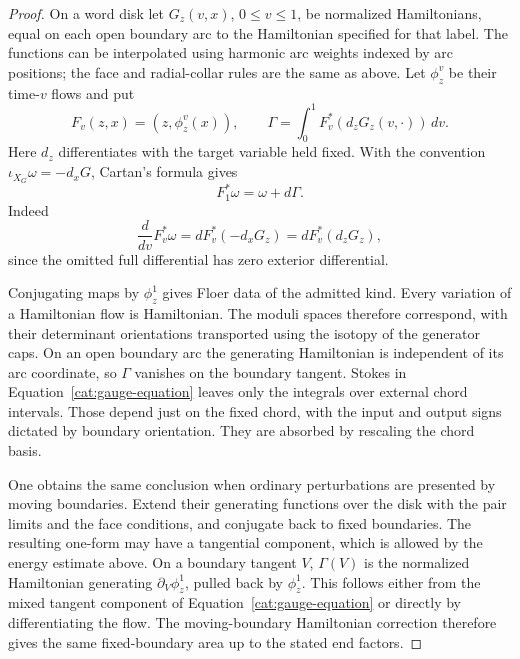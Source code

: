 \documentclass[11pt]{article}
\theoremstyle{definition}
\theoremstyle{remark}
\numberwithin{equation}{section}
\begin{document}
\begin{proof}
On a word disk let \(G_z(v,x)\), \(0\le v\le1\), be normalized
Hamiltonians, equal on each open boundary arc to the Hamiltonian
specified for that label.  The functions can be interpolated using
harmonic arc weights indexed by arc positions; the face and
radial-collar rules are the same as above.  Let \(\phi_z^v\) be their
time-\(v\) flows and put
\[
 F_v(z,x)=(z,\phi_z^v(x)),\qquad
 \Gamma=\int_0^1 F_v^*(d_zG_z(v,\cdot))\,dv .
\]
Here \(d_z\) differentiates with the target variable held fixed.
With the convention \(\iota_{X_G}\omega=-d_xG\), Cartan's formula gives
\begin{equation}\label{cat:gauge-equation}
 F_1^*\omega=\omega+d\Gamma.
\end{equation}
Indeed
\[
 \frac d{dv}F_v^*\omega
 =dF_v^*(-d_xG_z)
 =dF_v^*(d_zG_z),
\]
since the omitted full differential has zero exterior differential.

Conjugating maps by \(\phi_z^1\) gives Floer data of the admitted kind.
Every variation of a Hamiltonian flow is Hamiltonian.  The moduli
spaces therefore correspond, with their determinant orientations
transported using the isotopy of the generator caps.  On an open
boundary arc the generating Hamiltonian is independent of its arc
coordinate, so \(\Gamma\) vanishes on the boundary tangent.
Stokes in Equation~\eqref{cat:gauge-equation} leaves only the integrals
over external chord intervals.  Those depend just on the fixed chord,
with the input and output signs dictated by boundary orientation.
They are absorbed by rescaling the chord basis.

One obtains the same conclusion when ordinary perturbations are
presented by moving boundaries.  Extend their generating functions over
the disk with the pair limits and the face conditions, and conjugate
back to fixed boundaries.  The resulting one-form may have a tangential
component, which is allowed by the energy estimate above.  On a
boundary tangent \(V\), \(\Gamma(V)\) is the normalized Hamiltonian
generating \(\partial_V\phi_z^1\), pulled back by \(\phi_z^1\).
This follows either from the mixed tangent component of
Equation~\eqref{cat:gauge-equation} or directly by differentiating the
flow.  The moving-boundary Hamiltonian correction therefore gives the
same fixed-boundary area up to the stated end factors.
\end{proof}
\end{document}
